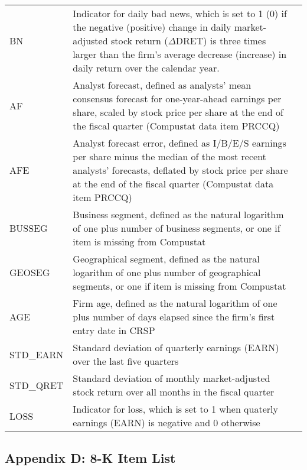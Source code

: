 \begin{table}[H]
\begin{tabular}{lp{15cm}p{15cm}}
		BN & Indicator for daily bad news, which is set to 1 (0) if the negative (positive) change in daily market-adjusted stock return ($\Delta$DRET) is three times larger than the firm’s average decrease (increase) in daily return over the calendar year.\\
		AF & Analyst forecast, defined as analysts' mean consensus forecast for one-year-ahead earnings per share, scaled by stock price per share at the end of the fiscal quarter (Compustat data item PRCCQ)\\
		AFE & Analyst forecast error, defined as I/B/E/S earnings per share minus the median of the most recent analysts' forecasts, deflated by stock price per share at the end of the fiscal quarter (Compustat data item PRCCQ)\\
		BUSSEG & Business segment, defined as the natural logarithm of one plus number of business segments, or one if item is missing from Compustat\\
		GEOSEG & Geographical segment, defined as the natural logarithm of one plus number of geographical segments, or one if item is missing from Compustat\\
		AGE & Firm age, defined as the natural logarithm of one plus number of days elapsed since the firm's first entry date in CRSP\\
		STD\_EARN & Standard deviation of quarterly earnings (EARN) over the last five quarters\\
		STD\_QRET & Standard deviation of monthly market-adjusted stock return over all months in the fiscal quarter\\
		LOSS & Indicator for loss, which is set to 1 when quaterly earnings (EARN) is negative and 0 otherwise\\
	\end{tabular}%
\end{table}%

\newpage
\subsection*{Appendix D: 8-K Item List}
\label{appd}


